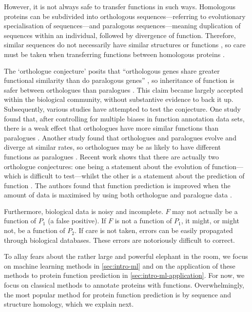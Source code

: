 However, it is not always safe to transfer functions in such ways. Homologous proteins can be subdivided into orthologous sequences---referring to evolutionary specialisation of sequences---and paralogous sequences---meaning duplication of sequences within an individual, followed by divergence of function. Therefore, similar sequences do not necessarily have similar structures or functions \cite{Bork1998,Sander1991}, so care must be taken when transferring functions between homologous proteins \cite{Fitch2000,Lee2007}.

The `orthologue conjecture' posits that ``orthologous genes share greater functional similarity than do paralogous genes'' \cite{Nehrt2011}, so inheritance of function is safer between orthologues than paralogues \cite{Loewenstein2009}. This claim became largely accepted within the biological community, without substantive evidence to back it up. Subsequently, various studies have attempted to test the conjecture. One study found that, after controlling for multiple biases in function annotation data sets, there is a weak effect that orthologues have more similar functions than paralogues \cite{Altenhoff2012}. Another study found that orthologues and paralogues evolve and diverge at similar rates, so orthologues may be as likely to have different functions as paralogues \cite{Studer2009}. Recent work shows that there are actually two orthologue conjectures: one being a statement about the evolution of function---which is difficult to test---whilst the other is a statement about the prediction of function \cite{Stamboulian2020}. The authors found that function prediction is improved when the amount of data is maximised by using both orthologue and paralogue data \cite{Stamboulian2020}. 

Furthermore, biological data is noisy and incomplete. $F$ may not actually be a function of $P_1$ (a false positive). If $F$ is not a function of $P_1$, it might, or might not, be a function of $P_2$. If care is not taken, errors can be easily propagated through biological databases. These errors are notoriously difficult to correct.

To allay fears about the rather large and powerful elephant in the room, we focus on machine learning methods in \ref{sec:intro-ml} and on the application of these methods to protein function prediction in \ref{sec:intro-ml-application}. For now, we focus on classical methods to annotate proteins with functions. Overwhelmingly, the most popular method for protein function prediction is by sequence and structure homology, which we explain next.

